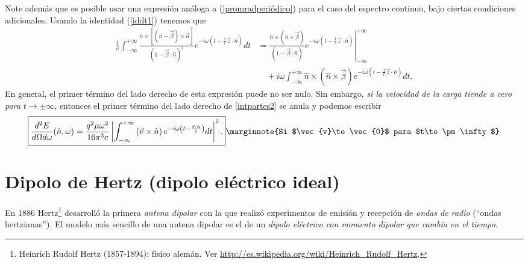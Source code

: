 Note además que es posible usar una expresión análoga a (\ref{promradperiódico}) para el caso del espectro continuo, bajo ciertas condiciones adicionales. Usando la identidad (\ref{iddt1}) tenemos que
\begin{align}
\frac{1}{c}\int_{-\infty}^{+\infty}\frac{\hat{n}\times\left[\left(\hat{n}-\vec{\beta}\right) \times\vec{a}\right]}{\left(
1-\vec{\beta}\cdot\hat{n}\right)^2}e^{-i\omega\left(  t
-\frac{1}{c}\vec{z}\cdot\hat{n}\right)}dt
&= \left.\frac{\hat{n}\times\left(  \hat{n}\times\vec{\beta}\right)
}{\left(1-\vec{\beta}\cdot\hat{n}\right)}
e^{-i\omega\left(t-\frac{1}{c}\vec{z}\cdot\hat{n}\right)}\right|^{+\infty}_{-\infty}
\nonumber\\
&\quad +i\omega \int_{-\infty}^{+\infty}\hat{n}\times\left(\hat{n}\times\vec{\beta}\right)
e^{-i\omega\left(t-\frac{1}{c}\vec{z}\cdot\hat{n}\right)  }dt. \label{intpartes2}
\end{align}
En general, el primer término del lado derecho de esta expresión puede no ser nulo. Sin embargo, \textit{si la velocidad de la carga tiende a cero para} $t\to\pm\infty$, entonces el primer término del lado derecho de \eqref{intpartes2} se anula y podemos escribir
\begin{equation}
\boxed{\frac{d^2E}{d\Omega d\omega}(\hat{n},\omega)
=\frac{q^2\mu\omega^2}{16\pi^3c}\left|\int_{-\infty}^{+\infty}
\left(  \vec{v}\times\hat{n}\right)
e^{-i\omega\left(t-\frac{\vec{z}\cdot\hat{n}}{c}\right)  }dt\right|^2 .} \label{dEdOdo2} \marginnote{Si $\vec{v}\to\vec{0}$ para $t\to\pm\infty$}
\end{equation}

\section{Dipolo de Hertz (dipolo eléctrico ideal)}

En 1886 Hertz\footnote{Heinrich Rudolf Hertz (1857-1894): físico alemán. Ver \url{http://es.wikipedia.org/wiki/Heinrich_Rudolf_Hertz}.} desarrolló la primera \textit{antena dipolar} con la que realizó experimentos de emisión y recepción de \textit{ondas de radio} (``ondas hertzianas''). El modelo más sencillo de una antena dipolar es el de un \textit{dipolo eléctrico con momento dipolar que cambia en el tiempo}.

